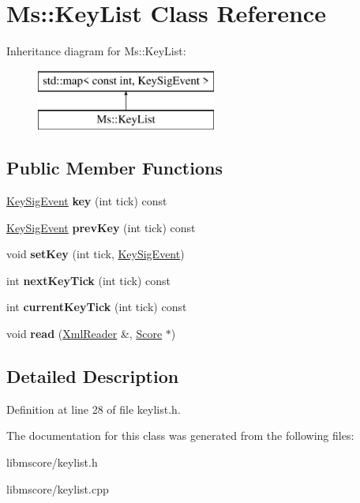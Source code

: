 \hypertarget{class_ms_1_1_key_list}{}\section{Ms\+:\+:Key\+List Class Reference}
\label{class_ms_1_1_key_list}
Inheritance diagram for Ms\+:\+:Key\+List\+:\begin{figure}[H]
\begin{center}
\leavevmode
\includegraphics[height=2.000000cm]{class_ms_1_1_key_list}
\end{center}
\end{figure}
\subsection*{Public Member Functions}
\begin{DoxyCompactItemize}
\item 
\mbox{\label{class_ms_1_1_key_list_a672339cc3b627593597ebbe7e9d8cf8b}} 
\hyperlink{class_ms_1_1_key_sig_event}{Key\+Sig\+Event} {\bfseries key} (int tick) const
\item 
\mbox{\label{class_ms_1_1_key_list_aa07149cf7031aaae6a3787b31b541899}} 
\hyperlink{class_ms_1_1_key_sig_event}{Key\+Sig\+Event} {\bfseries prev\+Key} (int tick) const
\item 
\mbox{\label{class_ms_1_1_key_list_a494e812d7f2e25443c5457c1d18b80d4}} 
void {\bfseries set\+Key} (int tick, \hyperlink{class_ms_1_1_key_sig_event}{Key\+Sig\+Event})
\item 
\mbox{\label{class_ms_1_1_key_list_ae1835a61f7106d787feea4573591423b}} 
int {\bfseries next\+Key\+Tick} (int tick) const
\item 
\mbox{\label{class_ms_1_1_key_list_a1494ec6572389787d8f44c7867d57549}} 
int {\bfseries current\+Key\+Tick} (int tick) const
\item 
\mbox{\label{class_ms_1_1_key_list_abbf326af0110185135cecdf884b58f13}} 
void {\bfseries read} (\hyperlink{class_ms_1_1_xml_reader}{Xml\+Reader} \&, \hyperlink{class_ms_1_1_score}{Score} $\ast$)
\end{DoxyCompactItemize}


\subsection{Detailed Description}


Definition at line 28 of file keylist.\+h.



The documentation for this class was generated from the following files\+:\begin{DoxyCompactItemize}
\item 
libmscore/keylist.\+h\item 
libmscore/keylist.\+cpp\end{DoxyCompactItemize}
